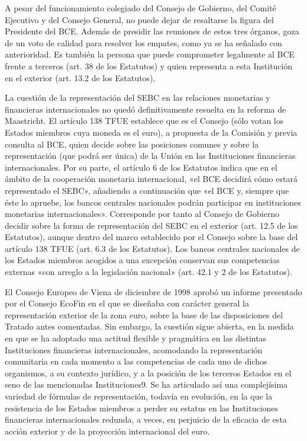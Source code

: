 \documentclass[10pt,a4paper]{article}
\begin{document}
A pesar del funcionamiento colegiado del Consejo de Gobierno, del Comité Ejecutivo y del Consejo General, no puede dejar de resaltarse la figura del Presidente del BCE. Además de presidir las reuniones de estos tres órganos, goza de un voto de calidad para resolver los empates, como ya se ha señalado con anterioridad. Es también la persona que puede comprometer legalmente al BCE frente a terceros (art. 38 de los Estatutos) y quien representa a esta Institución en el exterior (art. 13.2 de los Estatutos).

La cuestión de la representación del SEBC en las relaciones monetarias y financieras internacionales no quedó definitivamente resuelta en la reforma de Maastricht. El artículo 138 TFUE establece que es el Consejo (sólo votan los Estados miembros cuya moneda es el euro), a propuesta de la Comisión y previa consulta al BCE, quien decide sobre las posiciones comunes y sobre la representación (que podrá ser única) de la Unión en las Instituciones financieras internacionales. Por su parte, el artículo 6 de los Estatutos indica que en el ámbito de la cooperación monetaria internacional, «el BCE decidirá cómo estará representado el SEBC», añadiendo a continuación que «el BCE y, siempre que éste lo apruebe, los bancos centrales nacionales podrán participar en instituciones monetarias internacionales». Corresponde por tanto al Consejo de Gobierno decidir sobre la forma de representación del SEBC en el exterior (art. 12.5 de los Estatutos), aunque dentro del marco establecido por el Consejo sobre la base del artículo 138 TFUE (art. 6.3 de los Estatutos). Los bancos centrales nacionales de los Estados miembros acogidos a una excepción conservan sus competencias externas «con arreglo a la legislación nacional» (art. 42.1 y 2 de los Estatutos).

El Consejo Europeo de Viena de diciembre de 1998 aprobó un informe presentado por el Consejo EcoFin en el que se diseñaba con carácter general la representación exterior de la zona euro, sobre la base de las disposiciones del Tratado antes comentadas. Sin embargo, la cuestión sigue abierta, en la medida en que se ha adoptado una actitud flexible y pragmática en las distintas Instituciones financieras internacionales, acomodando la representación comunitaria en cada momento a las competencias de cada uno de dichos organismos, a su contexto jurídico, y a la posición de los terceros Estados en el seno de las mencionadas Instituciones9. Se ha articulado así una complejísima variedad de fórmulas de representación, todavía en evolución, en la que la resistencia de los Estados miembros a perder su estatus en las Instituciones financieras internacionales redunda, a veces, en perjuicio de la eficacia de esta acción exterior y de la proyección internacional del euro.
\end{document}
